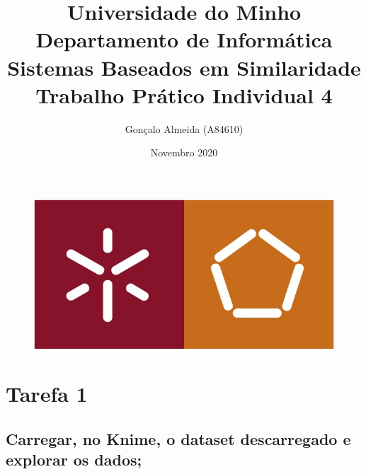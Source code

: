 \documentclass{article}
\title{
    \textbf{
        Universidade do Minho \\
        Departamento de Informática \\
        \vspace{1.5cm}
        Sistemas Baseados em Similaridade \\
        \vspace{1cm}
        Trabalho Prático Individual 4}
        \vspace{4cm}}
\author{Gonçalo Almeida (A84610)}
\date{Novembro 2020}
\begin{document}
\begin{figure}[t]
    \centering
    \includegraphics[scale=0.4]{Images/MIEI_logo.png}
\end{figure}

\maketitle

\clearpage

\section{Tarefa 1}

\subsection{Carregar, no Knime, o dataset descarregado e explorar os dados;}
\end{document}
